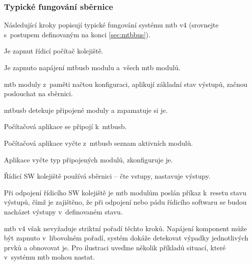 \subsubsection{\textbf{Typické fungování sběrnice}}

Následující kroky popisují typické fungování systému \gls{mtb} v4 (srovnejte
s~postupem definovaným na konci \ref{sec:mtbbus}).

\begin{compactenum}
\item Je zapnut řídicí počítač kolejiště.
\item Je zapnuto napájení \gls{mtbusb} modulu a~všech \gls{mtb} modulů.
\item \gls{mtb} moduly z~paměti načtou konfiguraci, aplikují základní stav
výstupů, začnou poslouchat na sběrnici.
\item \gls{mtbusb} detekuje připojené moduly a zapamatuje si je.
\item Počítačová aplikace se připojí k~\gls{mtbusb}.
\item Počítačová aplikace vyčte z~\gls{mtbusb} seznam aktivních modulů.
\item Aplikace vyčte typ připojených modulů, zkonfiguruje je.
\item Řídicí SW kolejiště používá sběrnici – čte vstupy, nastavuje výstupy.
\item Při odpojení řídicího SW kolejiště je \gls{mtb} modulům poslán příkaz
	k~resetu stavu výstupů, čímž je zajištěno, že při odpojení nebo pádu
	řídicího softwaru se budou nacházet výstupy v~definovaném stavu.
\end{compactenum}

\gls{mtb} v4 však nevyžaduje striktní pořadí těchto kroků. Napájení
komponent může být zapnuto v~libovolném pořadí, systém dokáže detekovat výpadky
jednotlivých prvků a obnovovat je. Pro ilustraci uveďme několik příkladů situací,
které v~systému \gls{mtb} mohou nastat.

